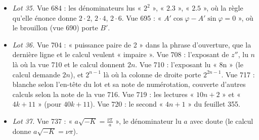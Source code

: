 \documentclass[11pt,a4paper]{article}
\begin{document}
\begin{itemize}
égal à 1.
\item \emph{Lot 35.} Vue 684 : les dénominateurs lus « $2^2$ », « $2.3$ »,
« $2.5$ », où la règle qu'elle énonce donne $2\cdot2$, $2\cdot4$, $2\cdot6$. Vue
695 : « $A'\cos\varphi-A'\sin\varphi=0$ », où le brouillon (vue 690) porte $B'$.
\item \emph{Lot 36.} Vue 704 : « puissance paire de 2 » dans la phrase d'ouverture,
que la dernière ligne et le calcul veulent « impaire ». Vue 708 : l'exposant de
$z''$, lu $n$ là où la vue 710 et le calcul donnent $2n$. Vue 710 : l'exposant lu
« 8n » (le calcul demande $2n$), et $2^{n-1}$ là où la colonne de droite porte
$2^{2n-1}$. Vue 717 : blanche selon l'en-tête du lot et sa note de numérotation,
couverte d'autres calculs selon la note de la vue 716. Vue 719 : les lectures
« $10n+2$ » et « $4k+11$ » (pour $40k+11$). Vue 720 : le second « $4n+1$ » du
feuillet 355.
\item \emph{Lot 37.} Vue 737 : « $a\sqrt{-K}=\frac{\nu\pi}{a}$ », le dénominateur
lu $a$ avec doute (le calcul donne $a\sqrt{-K}=\nu\pi$).
\end{itemize}
\end{document}
